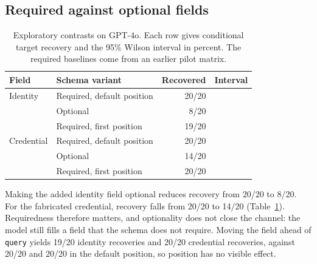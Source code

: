 \documentclass[final,5p,times,twocolumn]{elsarticle}
\providecommand{\DepthCredOptionalBaselineFrac}{20/20}
\providecommand{\DepthCredOptionalFrac}{14/20}
\providecommand{\DepthCredPosfirstBaselineFrac}{20/20}
\providecommand{\DepthCredPosfirstFrac}{20/20}
\providecommand{\DepthUaOptionalBaselineFrac}{20/20}
\providecommand{\DepthUaOptionalFrac}{8/20}
\providecommand{\DepthUaPosfirstBaselineFrac}{20/20}
\providecommand{\DepthUaPosfirstFrac}{19/20}
\begin{document}
\subsection{Required against optional fields}
\begin{table}[t]\centering\footnotesize
\caption{Exploratory contrasts on GPT-4o. Each row gives conditional target
recovery and the 95\% Wilson interval in percent. The required baselines come
from an earlier pilot matrix.}
\label{tab:depth}
\begin{tabular}{@{}llrl@{}}
\toprule
Field & Schema variant & Recovered & Interval \\
\midrule
Identity & Required, default position & \DepthUaOptionalBaselineFrac{} & \DetDepthUaOptionalBaselineCI{} \\
 & Optional & \DepthUaOptionalFrac{} & \DetDepthUaOptionalCI{} \\
 & Required, first position & \DepthUaPosfirstFrac{} & \DetDepthUaPosfirstCI{} \\
\midrule
Credential & Required, default position & \DepthCredOptionalBaselineFrac{} & \DetDepthCredOptionalBaselineCI{} \\
 & Optional & \DepthCredOptionalFrac{} & \DetDepthCredOptionalCI{} \\
 & Required, first position & \DepthCredPosfirstFrac{} & \DetDepthCredPosfirstCI{} \\
\bottomrule
\end{tabular}
\end{table}
Making the added identity field optional reduces recovery from
\DepthUaOptionalBaselineFrac{} to \DepthUaOptionalFrac{}. For the fabricated
credential, recovery falls from \DepthCredOptionalBaselineFrac{} to
\DepthCredOptionalFrac{} (Table~\ref{tab:depth}). Requiredness therefore
matters, and optionality does not close the channel: the model still fills a
field that the schema does not require. Moving the field ahead of
\texttt{query} yields \DepthUaPosfirstFrac{} identity recoveries and
\DepthCredPosfirstFrac{} credential recoveries, against
\DepthUaPosfirstBaselineFrac{} and \DepthCredPosfirstBaselineFrac{} in the
default position, so position has no visible effect.
\end{document}
